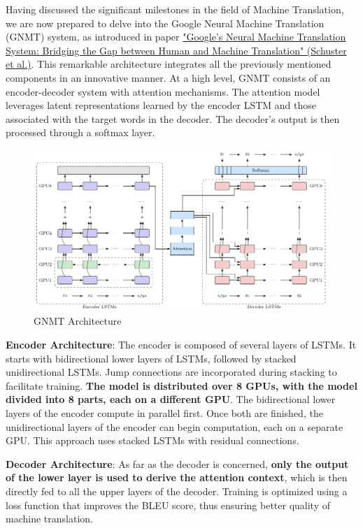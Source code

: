 Having discussed the significant milestones in the field of Machine Translation, we are now prepared to delve into the Google Neural Machine Translation (GNMT) system, as introduced in paper \href{https://arxiv.org/pdf/1609.08144}{"Google's Neural Machine Translation System: Bridging the Gap between Human and Machine Translation" (Schuster et al.)}. This remarkable architecture integrates all the previously mentioned components in an innovative manner. At a high level, GNMT consists of an encoder-decoder system with attention mechanisms. The attention model leverages latent representations learned by the encoder LSTM and those associated with the target words in the decoder. The decoder's output is then processed through a softmax layer.

\begin{figure}[!htbp]
    \centering
    \includegraphics[width=\linewidth]{tikz/chapter7 - GNMT.pdf}
    \caption{GNMT Architecture}
\end{figure}

\textbf{Encoder Architecture}: The encoder is composed of several layers of LSTMs. It starts with bidirectional lower layers of LSTMs, followed by stacked unidirectional LSTMs. Jump connections are incorporated during stacking to facilitate training. \textbf{The model is distributed over 8 GPUs, with the model divided into 8 parts, each on a different GPU}. The bidirectional lower layers of the encoder compute in parallel first. Once both are finished, the unidirectional layers of the encoder can begin computation, each on a separate GPU. This approach uses stacked LSTMs with residual connections.

\textbf{Decoder Architecture}: As far as the decoder is concerned, \textbf{only the output of the lower layer is used to derive the attention context}, which is then directly fed to all the upper layers of the decoder. Training is optimized using a loss function that improves the BLEU score, thus ensuring better quality of machine translation.


